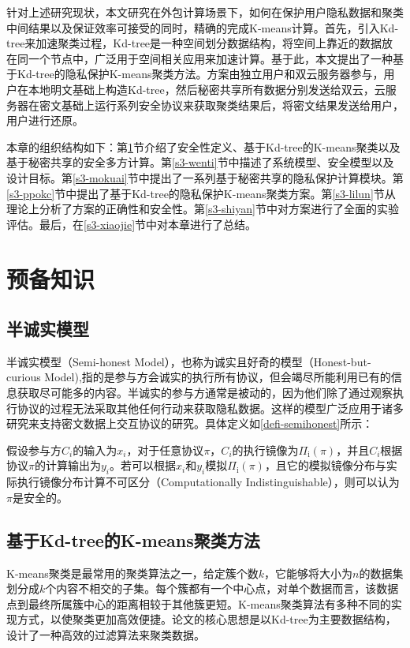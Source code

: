针对上述研究现状，本文研究在外包计算场景下，如何在保护用户隐私数据和聚类中间结果以及保证效率可接受的同时，精确的完成K-means计算。首先，引入Kd-tree来加速聚类过程，Kd-tree是一种空间划分数据结构，将空间上靠近的数据放在同一个节点中，广泛用于空间相关应用来加速计算。基于此，本文提出了一种基于Kd-tree的隐私保护K-means聚类方法。方案由独立用户和双云服务器参与，用户在本地明文基础上构造Kd-tree，然后秘密共享所有数据分别发送给双云，云服务器在密文基础上运行系列安全协议来获取聚类结果后，将密文结果发送给用户，用户进行还原。

本章的组织结构如下：第\ref{s3-yubei}节介绍了安全性定义、基于Kd-tree的K-means聚类以及基于秘密共享的安全多方计算。第\ref{s3-wenti}节中描述了系统模型、安全模型以及设计目标。第\ref{s3-mokuai}节中提出了一系列基于秘密共享的隐私保护计算模块。第\ref{s3-ppokc}节中提出了基于Kd-tree的隐私保护K-means聚类方案。第\ref{s3-lilun}节从理论上分析了方案的正确性和安全性。第\ref{s3-shiyan}节中对方案进行了全面的实验评估。最后，在\ref{s3-xiaojie}节中对本章进行了总结。
\section{预备知识}
\label{s3-yubei}
\subsection{半诚实模型}
半诚实模型（Semi-honest Model），也称为诚实且好奇的模型（Honest-but-curious Model),指的是参与方会诚实的执行所有协议，但会竭尽所能利用已有的信息获取尽可能多的内容。半诚实的参与方通常是被动的，因为他们除了通过观察执行协议的过程无法采取其他任何行动来获取隐私数据。这样的模型广泛应用于诸多研究来支持密文数据上交互协议的研究。具体定义\cite{oded2009foundations}如\ref{defi-semihonest}所示：

\begin{definition}
	\label{defi-semihonest}
	假设参与方$ C_i $的输入为$ x_i $，对于任意协议$ \pi $，$ C_i $的执行镜像为$\Pi_{\mathrm{i}}(\pi)$，并且$ C_i $根据协议$ \pi $的计算输出为$ y_i$。若可以根据$ x_i $和$ y_i $模拟$\Pi_{\mathrm{i}}(\pi)$，且它的模拟镜像分布与实际执行镜像分布计算不可区分（Computationally Indistinguishable），则可以认为$ \pi $是安全的。
\end{definition}

\subsection{基于Kd-tree的K-means聚类方法}
K-means聚类是最常用的聚类算法之一，给定簇个数$ k $，它能够将大小为$ n $的数据集划分成$ k $个内容不相交的子集。每个簇都有一个中心点，对单个数据而言，该数据点到最终所属簇中心的距离相较于其他簇更短。K-means聚类算法有多种不同的实现方式，以使聚类更加高效便捷。论文\cite{kanungo2002efficient}的核心思想是以Kd-tree为主要数据结构，设计了一种高效的过滤算法来聚类数据。


